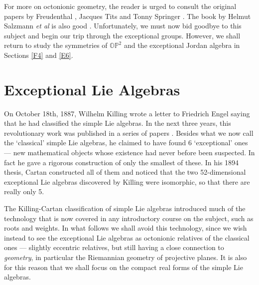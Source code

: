 \documentclass[12pt]{article}
\newcommand\OP{{\mathbb {OP}}}
\begin{document}
For more on octonionic geometry, the reader is urged to consult the
original papers by Freudenthal
\cite{Freudenthal4,Freudenthal,Freudenthal2,Freudenthal3}, Jacques Tits
\cite{Tits,Tits2} and Tonny Springer
\cite{Springer,Springer2,Springer3}.  The book by Helmut Salzmann {\it
et al} is also good \cite{Salzmann}.  Unfortunately, we must now bid
goodbye to this subject and begin our trip through the exceptional
groups.  However, we shall return to study the symmetries of $\OP^2$ and
the exceptional Jordan algebra in Sections \ref{F4} and \ref{E6}.

\section{Exceptional Lie Algebras}         \label{lie}   
 
On October 18th, 1887, Wilhelm Killing wrote a letter to Friedrich Engel
saying that he had classified the simple Lie algebras.  In the next
three years, this revolutionary work was published in a series of papers
\cite{Killing}.  Besides what we now call the `classical' simple Lie
algebras, he claimed to have found 6 `exceptional' ones --- new
mathematical objects whose existence had never before been suspected. In
fact he gave a rigorous construction of only the smallest of these. In
his 1894 thesis, Cartan \cite{Cartan0} constructed all of them and
noticed that the two 52-dimensional exceptional Lie algebras discovered
by Killing were isomorphic, so that there are really only 5.

The Killing-Cartan classification of simple Lie algebras introduced much
of the technology that is now covered in any introductory course on the
subject, such as roots and weights.  In what follows we shall avoid this
technology, since we wish instead to see the exceptional Lie algebras as
octonionic relatives of the classical ones --- slightly eccentric relatives,
but still having a close connection to {\it geometry}, in particular the
Riemannian geometry of projective planes.  It is also for this reason
that we shall focus on the compact real forms of the simple Lie algebras.
\end{document}
